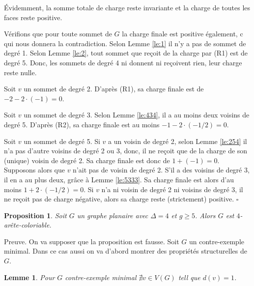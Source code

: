 \documentclass[10pt,a4paper]{article}
\newtheorem{proposition}{Proposition}
\newtheorem{lemme}{Lemme}
\newcommand{\ep}{{\hfill $\square$}}
\begin{document}
Évidemment, la somme totale de charge reste invariante et la charge de toutes les faces reste positive.

Vérifions que pour toute sommet de $G$ la charge finale est positive également, c qui nous donnera la contradiction.
Selon Lemme \ref{le:1} il n'y a pas de sommet de degré 1.
Selon Lemme \ref{le:2}, tout sommet que reçoit de la charge par (R1) est de degré 5. Donc, les sommets de degré 4 ni donnent ni reçoivent rien, leur charge reste nulle.

Soit $v$ un sommet de degré 2. D'après (R1), sa charge finale est de $-2 - 2\cdot (-1)=0$.

Soit $v$ un sommet de degré 3. Selon Lemme \ref{le:434}, il a au moins deux voisins de degré 5. D'après (R2), sa charge finale est au moins $-1 - 2\cdot (-1/2) = 0$.

Soit $v$ un sommet de degré 5. Si $v$ a un voisin de degré 2, selon Lemme \ref{le:254} il n'a pas d'autre voisins de degré 2 ou 3, donc, il ne reçoit que de la charge de son (unique) voisin de degré 2. Sa charge finale est donc de $1+(-1)=0$.
Supposons alors que $v$ n'ait pas de voisin de degré 2. S'il a des voisins de degré 3, il en a au plus deux, grâce à Lemme \ref{le:5333}. Sa charge finale est alors d'au moins $1+2\cdot(-1/2) = 0$. Si $v$ n'a ni voisin de degré 2 ni voisins de degré 3, il ne reçoit pas de charge négative, alors sa charge reste (strictement) positive.
\ep



\begin{proposition}
Soit $G$ un graphe planaire avec $\Delta = 4$ et $g \geq 5$. Alors $G$ est $4$-arête-coloriable.
\end{proposition}

Preuve. On va supposer que la proposition est fausse. Soit $G$ un contre-exemple minimal. Dans ce cas aussi on va d'abord montrer des propriétés structurelles de $G$.

\begin{lemme}
Pour $G$ contre-exemple minimal $\nexists v \in V(G)$ tell que $d(v) = 1$.
\end{lemme}
\end{document}
